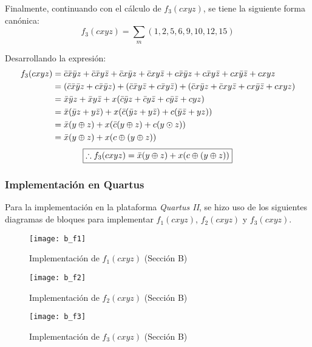 \documentclass[../procedimientos.tex]{subfiles}
\begin{document}
Finalmente, continuando con el cálculo de $f_3(cxyz)$, se tiene la siguiente 
forma canónica:
\begin{equation*}
  f_3(cxyz) = \sum_m (1, 2, 5, 6, 9, 10, 12, 15)
\end{equation*}

Desarrollando la expresión:
\begin{align*}
  f_3(cxyz) &= \bar{c}\bar{x}\bar{y}z + \bar{c}\bar{x}y\bar{z} + \bar{c}x\bar{y}z + 
  \bar{c}xy\bar{z} + c\bar{x}\bar{y}z + c\bar{x}y\bar{z} + cx\bar{y}\bar{z} + cxyz\\
  &= (\bar{c}\bar{x}\bar{y}z + c\bar{x}\bar{y}z) + (\bar{c}\bar{x}y\bar{z} + 
  c\bar{x}y\bar{z}) + (\bar{c}x\bar{y}z + \bar{c}xy\bar{z} + cx\bar{y}\bar{z} + 
  cxyz)\\
  &= \bar{x}\bar{y}z + \bar{x}y\bar{z} + x(\bar{c}\bar{y}z + \bar{c}y\bar{z} + 
  c\bar{y}\bar{z} + cyz)\\
  &= \bar{x}(\bar{y}z + y\bar{z}) + x(\bar{c}(\bar{y}z + y\bar{z}) + c(\bar{y}\bar{z} 
  + yz))\\
  &= \bar{x}(y \oplus z) + x(\bar{c}(y \oplus z) + c(y \odot z))\\
  &= \bar{x}(y \oplus z) + x(c \oplus (y \oplus z))
\end{align*}
\begin{equation*}
  \boxed{
    \therefore f_3(cxyz) = \bar{x}(y \oplus z) + x(c \oplus (y \oplus z))
  }
\end{equation*}

\subsubsection{Implementación en Quartus}
Para la implementación en la plataforma \textit{Quartus II}, se hizo uso de 
los siguientes diagramas de bloques para implementar $f_1(cxyz)$, $f_2(cxyz)$ 
y $f_3(cxyz)$.
\begin{figure}[H]
  \centering
  \texttt{[image: b\_f1]}
  \caption{Implementación de $f_1(cxyz)$ (Sección B)}
  \label{fig:b_f1}
\end{figure}
\begin{figure}[H]
  \centering
  \texttt{[image: b\_f2]}
  \caption{Implementación de $f_2(cxyz)$ (Sección B)}
  \label{fig:b_f2}
\end{figure}
\begin{figure}[H]
  \centering
  \texttt{[image: b\_f3]}
  \caption{Implementación de $f_3(cxyz)$ (Sección B)}
  \label{fig:b_f3}
\end{figure}
\end{document}
